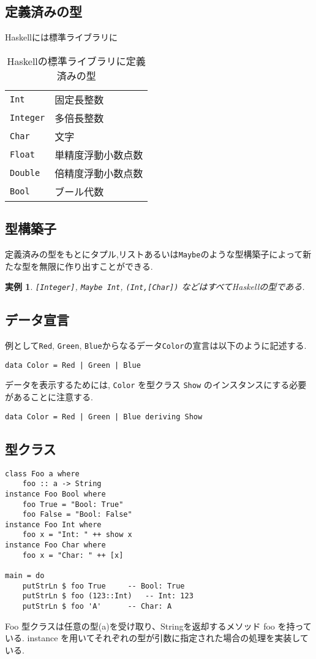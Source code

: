 \documentclass[dvipdfmx]{jsbook}
\theoremstyle{plain}
\newtheorem{example}[thm]{実例}
\begin{document}
\subsection{定義済みの型}
Haskellには標準ライブラリに
\begin{table}[h]
\caption{Haskellの標準ライブラリに定義済みの型}
\begin{center}
\begin{tabular}{ll}
\verb|Int|&固定長整数\\
\verb|Integer|&多倍長整数 \\
\verb|Char|&文字\\
\verb|Float|&単精度浮動小数点数\\
\verb|Double|&倍精度浮動小数点数\\
\verb|Bool|&ブール代数\\
\end{tabular}
\end{center}
\end{table}
\subsection{型構築子}
定義済みの型をもとにタプル,リストあるいは\verb|Maybe|のような型構築子によって新たな型を無限に作り出すことができる.
\begin{example}
\verb|[Integer]|, \verb|Maybe Int|,
\verb|(Int,[Char])| などはすべてHaskellの型である.
\end{example}
\subsection{データ宣言}
例として\verb|Red|, \verb|Green|, \verb|Blue|からなるデータ\verb|Color|の宣言は以下のように記述する.
\begin{lstlisting}
data Color = Red | Green | Blue 
\end{lstlisting}
データを表示するためには, \verb|Color| を型クラス \verb|Show| のインスタンスにする必要があることに注意する.
\begin{lstlisting}
data Color = Red | Green | Blue deriving Show
\end{lstlisting}
\subsection{型クラス}
\begin{lstlisting}
class Foo a where
    foo :: a -> String
instance Foo Bool where
    foo True = "Bool: True"
    foo False = "Bool: False"
instance Foo Int where
    foo x = "Int: " ++ show x
instance Foo Char where
    foo x = "Char: " ++ [x]

main = do
    putStrLn $ foo True		-- Bool: True
    putStrLn $ foo (123::Int)	-- Int: 123
    putStrLn $ foo 'A'		-- Char: A
\end{lstlisting}
Foo 型クラスは任意の型(a)を受け取り、Stringを返却するメソッド foo を持っている. instance を用いてそれぞれの型が引数に指定された場合の処理を実装している.
\end{document}
